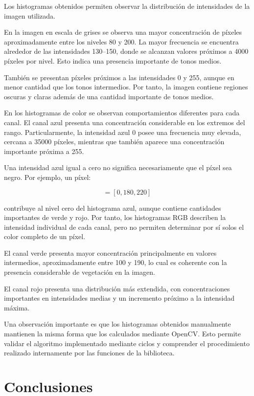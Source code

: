 \documentclass[11pt,letterpaper]{article}
\begin{document}
Los histogramas obtenidos permiten observar la distribución de intensidades de la imagen utilizada.

En la imagen en escala de grises se observa una mayor concentración de píxeles aproximadamente entre los niveles 80 y 200. La mayor frecuencia se encuentra alrededor de las intensidades 130--150, donde se alcanzan valores próximos a 4000 píxeles por nivel. Esto indica una presencia importante de tonos medios.

También se presentan píxeles próximos a las intensidades 0 y 255, aunque en menor cantidad que los tonos intermedios. Por tanto, la imagen contiene regiones oscuras y claras además de una cantidad importante de tonos medios.

En los histogramas de color se observan comportamientos diferentes para cada canal. El canal azul presenta una concentración considerable en los extremos del rango. Particularmente, la intensidad azul 0 posee una frecuencia muy elevada, cercana a 35000 píxeles, mientras que también aparece una concentración importante próxima a 255.

Una intensidad azul igual a cero no significa necesariamente que el píxel sea negro. Por ejemplo, un píxel:

\begin{equation}
[B,G,R]=[0,180,220]
\end{equation}

contribuye al nivel cero del histograma azul, aunque contiene cantidades importantes de verde y rojo. Por tanto, los histogramas RGB describen la intensidad individual de cada canal, pero no permiten determinar por sí solos el color completo de un píxel.

El canal verde presenta mayor concentración principalmente en valores intermedios, aproximadamente entre 100 y 190, lo cual es coherente con la presencia considerable de vegetación en la imagen.

El canal rojo presenta una distribución más extendida, con concentraciones importantes en intensidades medias y un incremento próximo a la intensidad máxima.

Una observación importante es que los histogramas obtenidos manualmente mantienen la misma forma que los calculados mediante OpenCV. Esto permite validar el algoritmo implementado mediante ciclos y comprender el procedimiento realizado internamente por las funciones de la biblioteca.

\section{Conclusiones}
\end{document}
